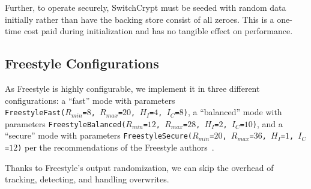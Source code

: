 Further, to operate securely, SwitchCrypt must be seeded with random data
initially rather than have the backing store consist of all zeroes. This is a
one-time cost paid during initialization and has no tangible effect on
performance.

\subsection{Freestyle Configurations}

As Freestyle is highly configurable, we implement it in three different
configurations: a ``fast'' mode with parameters
\\\texttt{FreestyleFast($R_{min}$=$8$, $R_{max}$=$20$, $H_I$=$4$, $I_C$=$8$)}, a
``balanced'' mode with parameters \texttt{FreestyleBalanced($R_{min}$=$12$,
$R_{max}$=$28$, $H_I$=$2$, $I_C$=$10$)}, and a ``secure'' mode with parameters
\texttt{FreestyleSecure($R_{min}$=$20$, $R_{max}$=$36$, $H_I$=$1$,
$I_C$=$12$)} per the recommendations of the Freestyle authors~\cite{Freestyle}.

Thanks to Freestyle's output randomization, we can skip the overhead of
tracking, detecting, and handling overwrites.
